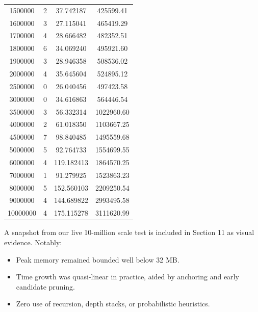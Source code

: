 \documentclass[11pt]{article}
\begin{document}
\begin{center}
\begin{longtable}{|c|c|c|c|}
1500000     & 2        & 37.742187  & 425599.41 \\
1600000     & 3        & 27.115041  & 465419.29 \\
1700000     & 4        & 28.666482  & 482352.51 \\
1800000     & 6        & 34.069240  & 495921.60 \\
1900000     & 3        & 28.946358  & 508536.02 \\
2000000     & 4        & 35.645604  & 524895.12 \\
2500000     & 0        & 26.040456  & 497423.58 \\
3000000     & 0        & 34.616863  & 564446.54 \\
3500000     & 3        & 56.332314  & 1022960.60 \\
4000000     & 2        & 61.018350  & 1103667.25 \\
4500000     & 7        & 98.840485  & 1495559.68 \\
5000000     & 5        & 92.764733  & 1554699.55 \\
6000000     & 4        & 119.182413 & 1864570.25 \\
7000000     & 1        & 91.279925  & 1523863.23 \\
8000000     & 5        & 152.560103 & 2209250.54 \\
9000000     & 4        & 144.689822 & 2993495.58 \\
10000000    & 4        & 175.115278 & 3111620.99 \\
\hline
\end{longtable}
\end{center}



\vspace{1em}
\noindent
A snapshot from our live 10-million scale test is included in Section 11 as visual evidence. Notably:
\begin{itemize}
  \item Peak memory remained bounded well below 32 MB.
  \item Time growth was quasi-linear in practice, aided by anchoring and early candidate pruning.
  \item Zero use of recursion, depth stacks, or probabilistic heuristics.
\end{itemize}

\vspace{1em}
\end{document}
